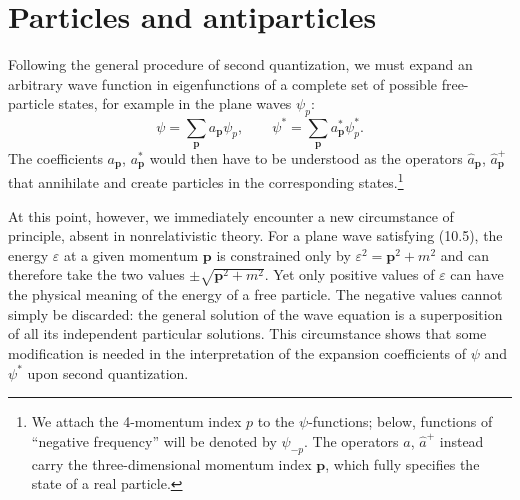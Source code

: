 
\section{Particles and antiparticles}

Following the general procedure of second quantization, we must expand an arbitrary wave function in eigenfunctions of a complete set of possible free-particle states, for example in the plane waves $\psi_p$:
\[
\psi=\sum_{\mathbf p}a_{\mathbf p}\psi_p,
\qquad
\psi^*=\sum_{\mathbf p}a^*_{\mathbf p}\psi^*_p.
\]
The coefficients $a_{\mathbf p}$, $a^*_{\mathbf p}$ would then have to be understood as the operators $\widehat a_{\mathbf p}$, $\widehat a^+_{\mathbf p}$ that annihilate and create particles in the corresponding states.\footnote{We attach the 4-momentum index $p$ to the $\psi$-functions; below, functions of ``negative frequency'' will be denoted by $\psi_{-p}$. The operators $\widehat a$, $\widehat a^+$ instead carry the three-dimensional momentum index $\mathbf p$, which fully specifies the state of a real particle.}

At this point, however, we immediately encounter a new circumstance of principle, absent in nonrelativistic theory. For a plane wave satisfying (10.5), the energy $\varepsilon$ at a given momentum $\mathbf p$ is constrained only by $\varepsilon^2=\mathbf p^2+m^2$ and can therefore take the two values $\pm\sqrt{\mathbf p^2+m^2}$. Yet only positive values of $\varepsilon$ can have the physical meaning of the energy of a free particle. The negative values cannot simply be discarded: the general solution of the wave equation is a superposition of all its independent particular solutions. This circumstance shows that some modification is needed in the interpretation of the expansion coefficients of $\psi$ and $\psi^*$ upon second quantization.

